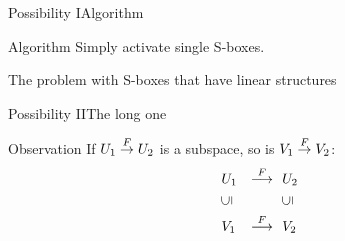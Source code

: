 \begin{frame}{Possibility I}{Algorithm}
    \begin{block}{Algorithm}
        Simply activate single S-boxes.
    \end{block}
    \begin{block}{The problem with S-boxes that have linear structures}
    \end{block}
\end{frame}

\begin{frame}{Possibility II}{The long one}
    \begin{block}{Observation}
        \vspace{0.25em}
        If $U_1 \stackrel{F}{\rightarrow} U_2$ is a subspace, so is $V_1 \stackrel{F}{\rightarrow} V_2$:
        \begin{equation*}
        \begin{aligned}
            & U_1 & \stackrel{F}{\longrightarrow}\ &\ U_2 \\
            & \rotatebox[origin=c]{90}{$\subseteq$} & &\ \rotatebox[origin=c]{90}{$\subseteq$} \\
            & V_1 & \stackrel{F}{\longrightarrow}\ &\ V_2
        \end{aligned}
        \end{equation*}
    \end{block}
\end{frame}

